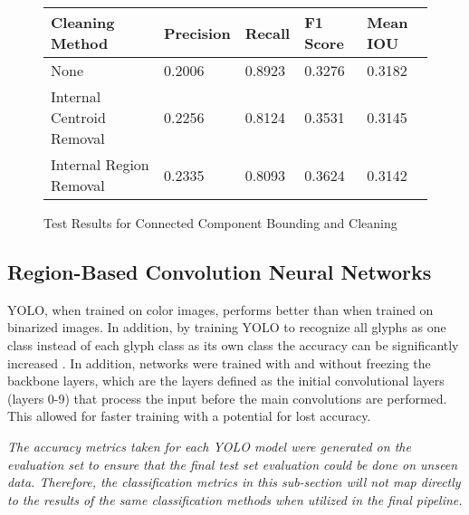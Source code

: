 \begin{figure}[H]
    \caption{Test Results for Connected Component Bounding and Cleaning}
    \label{fig:ccBoundingEval}
    \centering
    \begin{tabular}{ | l | l | l | l | l | }
        \hline
        Cleaning Method & Precision & Recall & F1 Score & Mean IOU \\
        \hline
        None & 0.2006 & 0.8923 & 0.3276 & 0.3182 \\
        Internal Centroid Removal & 0.2256 & 0.8124 & 0.3531 & 0.3145 \\
        Internal Region Removal & 0.2335 & 0.8093 & 0.3624 & 0.3142 \\
        \hline
    \end{tabular}
\end{figure}

\subsection{Region-Based Convolution Neural Networks}

YOLO, when trained on color images, performs better than when trained on binarized images. In addition, by training YOLO to recognize all glyphs as one class instead of each glyph class as its own class the accuracy can be significantly increased . In addition, networks were trained with and without freezing the backbone layers, which are the layers defined as the initial convolutional layers (layers 0-9) \cite{YoloBackbone} that process the input before the main convolutions are performed. This allowed for faster training with a potential for lost accuracy.

\textit{The accuracy metrics taken for each YOLO model were generated on the evaluation set to ensure that the final test set evaluation could be done on unseen data. Therefore, the classification metrics in this sub-section will not map directly to the results of the same classification methods when utilized in the final pipeline.}


